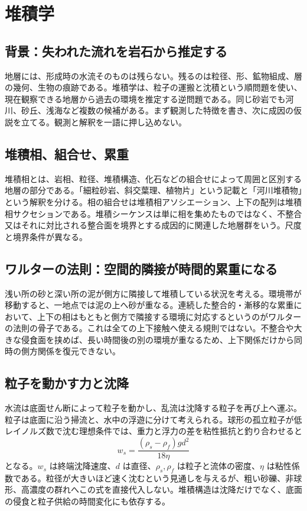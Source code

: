 \chapter{堆積学}
\section{背景：失われた流れを岩石から推定する}
\label{theory:sediment:background}
地層には、形成時の水流そのものは残らない。残るのは粒径、形、鉱物組成、層の幾何、生物の痕跡である。堆積学は、粒子の運搬と沈積という順問題を使い、現在観察できる地層から過去の環境を推定する逆問題である。同じ砂岩でも河川、砂丘、浅海など複数の候補がある。まず観測した特徴を書き、次に成因の仮説を立てる。観測と解釈を一語に押し込めない。\cite{sed_mit_environment}

\section{堆積相、組合せ、累重}
\label{theory:sediment:facies}
堆積相とは、岩相、粒径、堆積構造、化石などの組合せによって周囲と区別する地層の部分である。「細粒砂岩、斜交葉理、植物片」という記載と「河川堆積物」という解釈を分ける。相の組合せは堆積相アソシエーション、上下の配列は堆積相サクセションである。堆積シーケンスは単に相を集めたものではなく、不整合又はそれに対比される整合面を境界とする成因的に関連した地層群をいう。尺度と境界条件が異なる。\cite{sed_mit_environment,sed_walther_oregon}

\section{ワルターの法則：空間的隣接が時間的累重になる}
\label{theory:sediment:walther}
浅い所の砂と深い所の泥が側方に隣接して堆積している状況を考える。環境帯が移動すると、一地点では泥の上へ砂が重なる。連続した整合的・漸移的な累重において、上下の相はもともと側方で隣接する環境に対応するというのがワルターの法則の骨子である。これは全ての上下接触へ使える規則ではない。不整合や大きな侵食面を挟めば、長い時間後の別の環境が重なるため、上下関係だけから同時の側方関係を復元できない。\cite{sed_walther_oregon}

\section{粒子を動かす力と沈降}
\label{theory:sediment:transport}
水流は底面せん断によって粒子を動かし、乱流は沈降する粒子を再び上へ運ぶ。粒子は底面に沿う掃流と、水中の浮遊に分けて考えられる。球形の孤立粒子が低レイノルズ数で沈む理想条件では、重力と浮力の差を粘性抵抗と釣り合わせると
\[
 w_s=\frac{(\rho_s-\rho_f)gd^2}{18\eta}
\]
となる。\(w_s\) は終端沈降速度、\(d\) は直径、\(\rho_s,\rho_f\) は粒子と流体の密度、\(\eta\) は粘性係数である。粒径が大きいほど速く沈むという見通しを与えるが、粗い砂礫、非球形、高濃度の群れへこの式を直接代入しない。堆積構造は沈降だけでなく、底面の侵食と粒子供給の時間変化にも依存する。


